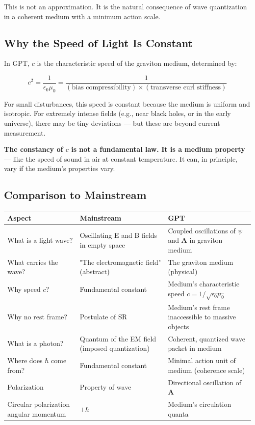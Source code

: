 \documentclass[12pt, a4paper]{article}
\begin{document}
This is not an approximation. It is the natural consequence of wave quantization in a coherent medium with a minimum action scale.

\subsection{Why the Speed of Light Is Constant}
\label{subsec:speed_light_constant}

In GPT, \( c \) is the characteristic speed of the graviton medium, determined by:

\[
c^2 = \frac{1}{\epsilon_0 \mu_0} = \frac{1}{(\text{bias compressibility}) \times (\text{transverse curl stiffness})}
\]

For small disturbances, this speed is constant because the medium is uniform and isotropic. For extremely intense fields (e.g., near black holes, or in the early universe), there may be tiny deviations — but these are beyond current measurement.

\textbf{The constancy of \( c \) is not a fundamental law. It is a medium property} — like the speed of sound in air at constant temperature. It can, in principle, vary if the medium's properties vary.

\subsection{Comparison to Mainstream}
\label{subsec:em_waves_comparison}

\begin{center}
\begin{tabular}{|p{4cm}|p{5cm}|p{5cm}|}
\hline
\textbf{Aspect} & \textbf{Mainstream} & \textbf{GPT} \\
\hline
What is a light wave? & Oscillating E and B fields in empty space & Coupled oscillations of \( \psi \) and \( \mathbf{A} \) in graviton medium \\
\hline
What carries the wave? & "The electromagnetic field" (abstract) & The graviton medium (physical) \\
\hline
Why speed \( c \)? & Fundamental constant & Medium's characteristic speed \( c = 1/\sqrt{\epsilon_0 \mu_0} \) \\
\hline
Why no rest frame? & Postulate of SR & Medium's rest frame inaccessible to massive objects \\
\hline
What is a photon? & Quantum of the EM field (imposed quantization) & Coherent, quantized wave packet in medium \\
\hline
Where does \( \hbar \) come from? & Fundamental constant & Minimal action unit of medium (coherence scale) \\
\hline
Polarization & Property of wave & Directional oscillation of \( \mathbf{A} \) \\
\hline
Circular polarization angular momentum & \( \pm \hbar \) & Medium's circulation quanta \\
\hline
\end{tabular}
\end{center}
\end{document}
